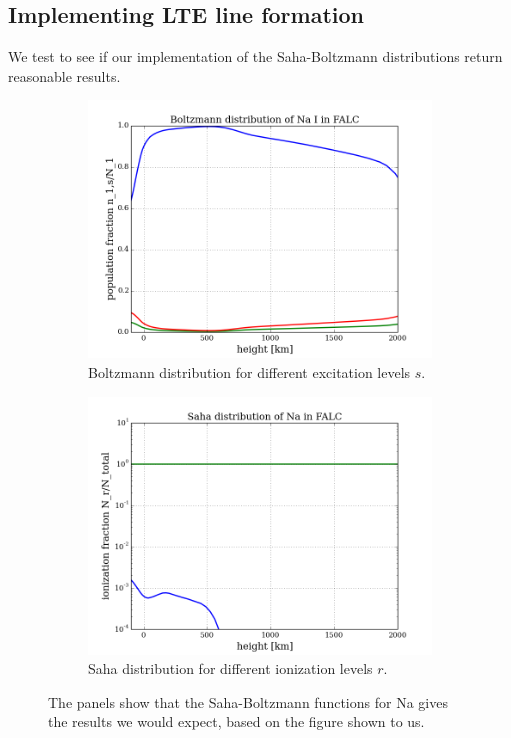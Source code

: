 \documentclass{article}
\begin{document}
\subsection{Implementing LTE line formation}
We test to see if our implementation of the Saha-Boltzmann distributions return reasonable results.
\begin{figure}[H]
  \centering
  \begin{subfigure}{0.49\textwidth}
    \includegraphics[scale=0.37]{../figures/task3/boltzmann.png}
    \caption{Boltzmann distribution for different excitation levels $s$.}
  \end{subfigure}
  \begin{subfigure}{0.49\textwidth}
    \includegraphics[scale=0.37]{../figures/task3/saha.png}
    \caption{Saha distribution for different ionization levels $r$.}
  \end{subfigure}
  \caption{The panels show that the Saha-Boltzmann functions for Na gives the results we would expect, based on the figure shown to us.}
\end{figure}
\end{document}
